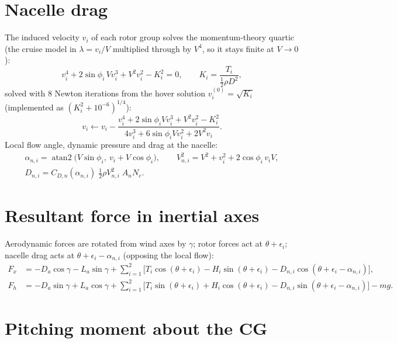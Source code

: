 \documentclass[10pt,a4paper]{article}
\begin{document}
\section{Nacelle drag}

The induced velocity $v_i$ of each rotor group solves the momentum-theory quartic (the cruise model in
$\lambda = v_i/V$ multiplied through by $V^4$, so it stays finite at $V\to 0$):
\begin{equation}
v_i^4 + 2\sin\phi_i\, V v_i^3 + V^2 v_i^2 - K_i^2 = 0, \qquad K_i = \frac{T_i}{\tfrac12 \rho D^2},
\end{equation}
solved with 8 Newton iterations from the hover solution $v_i^{(0)} = \sqrt{K_i}$
(implemented as $(K_i^2 + 10^{-6})^{1/4}$):
\begin{equation}
v_i \leftarrow v_i - \frac{v_i^4 + 2\sin\phi_i V v_i^3 + V^2 v_i^2 - K_i^2}{4v_i^3 + 6\sin\phi_i V v_i^2 + 2V^2 v_i}.
\end{equation}
Local flow angle, dynamic pressure and drag at the nacelle:
\begin{gather}
\alpha_{n,i} = \operatorname{atan2}\!\big(V\sin\phi_i,\ v_i + V\cos\phi_i\big), \qquad
V_{n,i}^2 = V^2 + v_i^2 + 2\cos\phi_i\, v_i V, \\
D_{n,i} = C_{D,n}(\alpha_{n,i})\; \tfrac12\rho V_{n,i}^2\; A_n N_e .
\end{gather}

\section{Resultant force in inertial axes}

Aerodynamic forces are rotated from wind axes by $\gamma$; rotor forces act at $\theta+\epsilon_i$;
nacelle drag acts at $\theta+\epsilon_i-\alpha_{n,i}$ (opposing the local flow):
\begin{align}
F_x &= -D_a\cos\gamma - L_a\sin\gamma
 + \sum_{i=1}^{2}\Big[ T_i\cos(\theta+\epsilon_i) - H_i\sin(\theta+\epsilon_i) - D_{n,i}\cos(\theta+\epsilon_i-\alpha_{n,i}) \Big], \\
F_h &= -D_a\sin\gamma + L_a\cos\gamma
 + \sum_{i=1}^{2}\Big[ T_i\sin(\theta+\epsilon_i) + H_i\cos(\theta+\epsilon_i) - D_{n,i}\sin(\theta+\epsilon_i-\alpha_{n,i}) \Big] - m g .
\end{align}

\section{Pitching moment about the CG}
\end{document}
